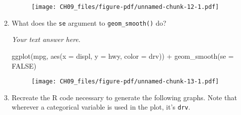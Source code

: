 \documentclass[
  letterpaper,
  DIV=11,
  numbers=noendperiod]{scrreprt}
\newenvironment{Shaded}{\begin{snugshade}}{\end{snugshade}}
\newcommand{\AttributeTok}[1]{\textcolor[rgb]{0.40,0.45,0.13}{#1}}
\newcommand{\ConstantTok}[1]{\textcolor[rgb]{0.56,0.35,0.01}{#1}}
\newcommand{\FunctionTok}[1]{\textcolor[rgb]{0.28,0.35,0.67}{#1}}
\newcommand{\NormalTok}[1]{\textcolor[rgb]{0.00,0.23,0.31}{#1}}
\newcommand{\SpecialCharTok}[1]{\textcolor[rgb]{0.37,0.37,0.37}{#1}}
\begin{document}
\begin{enumerate}
\begin{tcolorbox}
  \begin{figure}[H]

  {\centering \texttt{[image: CH09\_files/figure-pdf/unnamed-chunk-12-1.pdf]}

  }

  \end{figure}

  \end{tcolorbox}
\item
  What does the \texttt{se} argument to \texttt{geom\_smooth()} do?

  \begin{tcolorbox}[enhanced jigsaw, breakable, bottomtitle=1mm, left=2mm, colback=white, toprule=.15mm, leftrule=.75mm, colframe=quarto-callout-note-color-frame, colbacktitle=quarto-callout-note-color!10!white, title={Answer}, coltitle=black, toptitle=1mm, bottomrule=.15mm, opacitybacktitle=0.6, arc=.35mm, rightrule=.15mm, titlerule=0mm, opacityback=0]

  \emph{Your text answer here.}

\begin{Shaded}
\begin{Highlighting}[]
\FunctionTok{ggplot}\NormalTok{(mpg, }\FunctionTok{aes}\NormalTok{(}\AttributeTok{x =}\NormalTok{ displ, }\AttributeTok{y =}\NormalTok{ hwy, }\AttributeTok{color =}\NormalTok{ drv)) }\SpecialCharTok{+}
  \FunctionTok{geom\_smooth}\NormalTok{(}\AttributeTok{se =} \ConstantTok{FALSE}\NormalTok{)}
\end{Highlighting}
\end{Shaded}

  \begin{figure}[H]

  {\centering \texttt{[image: CH09\_files/figure-pdf/unnamed-chunk-13-1.pdf]}

  }

  \end{figure}

  \end{tcolorbox}
\item
  Recreate the R code necessary to generate the following graphs. Note
  that wherever a categorical variable is used in the plot, it's
  \texttt{drv}.

  \begin{figure}

  \begin{minipage}[t]{0.50\linewidth}

  {\centering 

  \raisebox{-\height}{

}}
\end{minipage}
\end{figure}
\end{enumerate}
\end{document}
